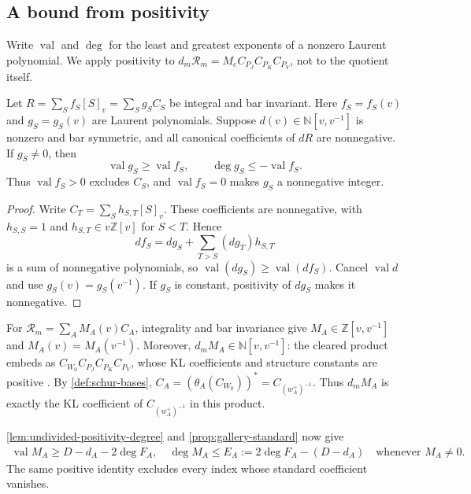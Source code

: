 \documentclass[a4paper,11pt]{amsart}
\numberwithin{equation}{subsection}
\theoremstyle{plain}
\theoremstyle{definition}
\theoremstyle{remark}
\begin{document}
\subsection{A bound from positivity}

Write $\operatorname{val}$ and $\deg$ for the least and greatest
exponents of a nonzero Laurent polynomial. We apply positivity
to $d_m\mathcal R_m=M_eC_{P_J}C_{P_K}C_{P_V}$, not to the quotient itself.

\begin{lemma}\label{lem:undivided-positivity-degree}
Let $R=\sum_S f_S[S]_v=\sum_S g_SC_S$ be integral and bar invariant.
Here $f_S=f_S(v)$ and $g_S=g_S(v)$ are Laurent polynomials.
Suppose $d(v)\in\mathbb N[v,v^{-1}]$ is nonzero and bar symmetric, and all
canonical coefficients of $dR$ are nonnegative. If $g_S\ne0$, then
\[
\operatorname{val}g_S\ge\operatorname{val}f_S,\qquad
\deg g_S\le-\operatorname{val}f_S.
\]
Thus $\operatorname{val}f_S>0$ excludes $C_S$, and
$\operatorname{val}f_S=0$ makes $g_S$ a nonnegative integer.
\end{lemma}

\begin{proof}
Write $C_T=\sum_S h_{S,T}[S]_v$. These coefficients are
nonnegative, with $h_{S,S}=1$ and $h_{S,T}\in v\mathbb Z[v]$
for $S<T$. Hence
\[
df_S=dg_S+\sum_{T>S}(dg_T)h_{S,T}
\]
is a sum of nonnegative polynomials, so
$\operatorname{val}(dg_S)\ge\operatorname{val}(df_S)$.
Cancel $\operatorname{val}d$ and use $g_S(v)=g_S(v^{-1})$.
If $g_S$ is constant, positivity of $dg_S$ makes it nonnegative.
\end{proof}

For $\mathcal R_m=\sum_A M_A(v)C_A$, integrality and bar invariance
give $M_A\in\mathbb Z[v,v^{-1}]$ and $M_A(v)=M_A(v^{-1})$.
Moreover, $d_mM_A\in\mathbb N[v,v^{-1}]$: the cleared product
embeds as $C_{W_0}C_{P_J}C_{P_K}C_{P_V}$,
whose KL coefficients and structure constants are positive
\cite{KL80,Springer82}.
By \autoref{def:schur-bases},
$C_A=(\theta_A(C_{W_0}))^*=C_{(w_A^+)^{-1}}$.
Thus $d_mM_A$ is exactly the KL coefficient of
$C_{(w_A^+)^{-1}}$ in this product.

\autoref{lem:undivided-positivity-degree} and \autoref{prop:gallery-standard} now give
\begin{gather}\label{eq:relevance-bound}
\operatorname{val}M_A\ge D-d_A-2\deg F_A,\quad
\deg M_A\le E_A:=2\deg F_A-(D-d_A)
\quad\text{whenever }M_A\ne0.
\end{gather}
The same positive identity excludes every
index whose standard coefficient vanishes.
\end{document}
